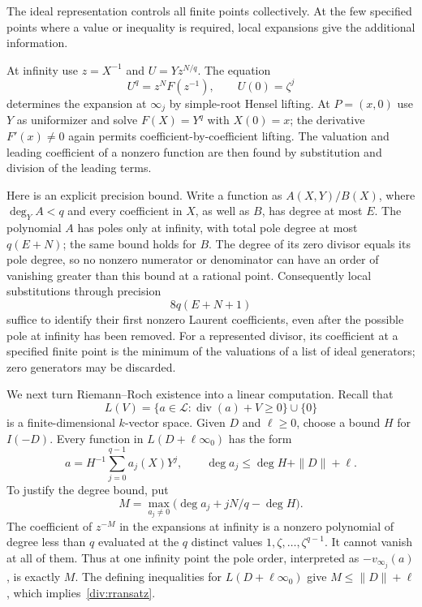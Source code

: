 The ideal representation controls all finite points collectively.  At the
few specified points where a value or inequality is required, local
expansions give the additional information.

At infinity use $z=X^{-1}$ and $U=Yz^{N/q}$.  The equation
\[
 U^q=z^NF(z^{-1}),\qquad U(0)=\zeta^j
\]
determines the expansion at $\infty_j$ by simple-root Hensel lifting.
At $P=(x,0)$ use $Y$ as uniformizer and solve $F(X)=Y^q$ with $X(0)=x$;
the derivative $F'(x)\ne0$ again permits coefficient-by-coefficient
lifting.  The valuation and leading coefficient of a nonzero function
are then found by substitution and division of the leading terms.

Here is an explicit precision bound.  Write a function as
$A(X,Y)/B(X)$, where $\deg_Y A<q$ and every coefficient in $X$, as well
as $B$, has degree at most $E$.  The polynomial $A$ has poles only at
infinity, with total pole degree at most $q(E+N)$; the same bound holds
for $B$.  The degree of its zero divisor equals its pole degree, so no
nonzero numerator or denominator can have an order of vanishing greater
than this bound at a rational point.  Consequently local substitutions
through precision
\begin{equation}\label{div:precision}
 8q(E+N+1)
\end{equation}
suffice to identify their first nonzero Laurent coefficients, even after
the possible pole at infinity has been removed.  For a represented
divisor, its coefficient at a specified finite point is the minimum of
the valuations of a list of ideal generators; zero generators may be
discarded.

We next turn Riemann--Roch existence into a linear computation.  Recall
that
\[
 L(V)=\{a\in\mathcal L:\operatorname{div}(a)+V\geq0\}\cup\{0\}
\]
is a finite-dimensional $k$-vector space.  Given $D$ and $\ell\geq0$,
choose a bound $H$ for $I(-D)$.  Every function in $L(D+\ell\infty_0)$
has the form
\begin{equation}\label{div:rransatz}
 a=H^{-1}\sum_{j=0}^{q-1}a_j(X)Y^j,
 \qquad \deg a_j\leq \deg H+\|D\|+\ell.
\end{equation}
To justify the degree bound, put
\[
 M=\max_{a_j\ne0}\bigl(\deg a_j+jN/q-\deg H\bigr).
\]
The coefficient of $z^{-M}$ in the expansions at infinity is a nonzero
polynomial of degree less than $q$ evaluated at the $q$ distinct values
$1,\zeta,\ldots,\zeta^{q-1}$.  It cannot vanish at all of them.  Thus
at one infinity point the pole order, interpreted as $-v_{\infty_j}(a)$,
is exactly $M$.  The defining inequalities for $L(D+\ell\infty_0)$ give
$M\leq\|D\|+\ell$, which implies~\eqref{div:rransatz}.

